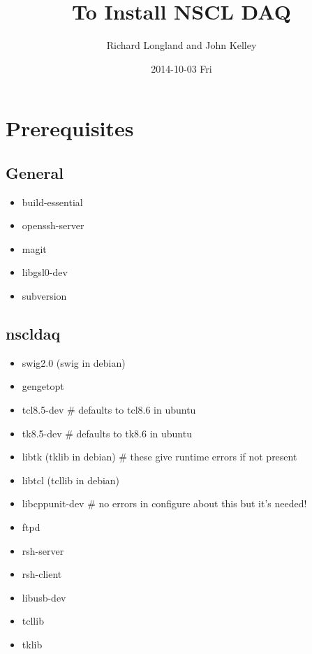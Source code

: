 \documentclass[11pt]{article}
\author{Richard Longland and John Kelley}
\date{2014-10-03 Fri}
\title{To Install NSCL DAQ}
\begin{document}
\maketitle


\section*{Prerequisites}
\label{sec-1}
\subsection*{General}
\label{sec-1-1}
\begin{itemize}
\item build-essential
\item openssh-server
\item magit
\item libgsl0-dev
\item subversion
\end{itemize}

\subsection*{nscldaq}
\label{sec-1-2}
\begin{itemize}
\item swig2.0 (swig in debian)
\item gengetopt
\item tcl8.5-dev         \# defaults to tcl8.6 in ubuntu
\item tk8.5-dev          \# defaults to tk8.6 in ubuntu
\item libtk    (tklib in debian)     \# these give runtime errors if not present
\item libtcl   (tcllib in debian)
\item libcppunit-dev  \# no errors in configure about this but it's needed!
\item ftpd
\item rsh-server
\item rsh-client
\item libusb-dev
\item tcllib
\item tklib
\end{itemize}
\end{document}
